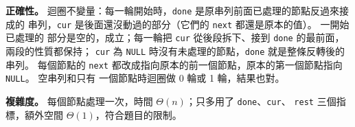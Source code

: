 \begin{pastsoln}
\textbf{正確性。} 迴圈不變量：每一輪開始時，\texttt{done} 是原串列前面已處理的節點反過來接成的
串列，\texttt{cur} 是後面還沒動過的部分（它們的 \texttt{next} 都還是原本的值）。 一開始已處理的
部分是空的，成立；每一輪把 \texttt{cur} 從後段拆下、接到 \texttt{done} 的最前面，兩段的性質都保持；
\texttt{cur} 為 \texttt{NULL} 時沒有未處理的節點，\texttt{done} 就是整條反轉後的串列。 每個節點的
\texttt{next} 都改成指向原本的前一個節點，原本的第一個節點指向 \texttt{NULL}。 空串列和只有
一個節點時迴圈做 0 輪或 1 輪，結果也對。

\textbf{複雜度。} 每個節點處理一次，時間 $\Theta(n)$；只多用了 \texttt{done}、\texttt{cur}、
\texttt{rest} 三個指標，額外空間 $\Theta(1)$，符合題目的限制。
\end{pastsoln}
